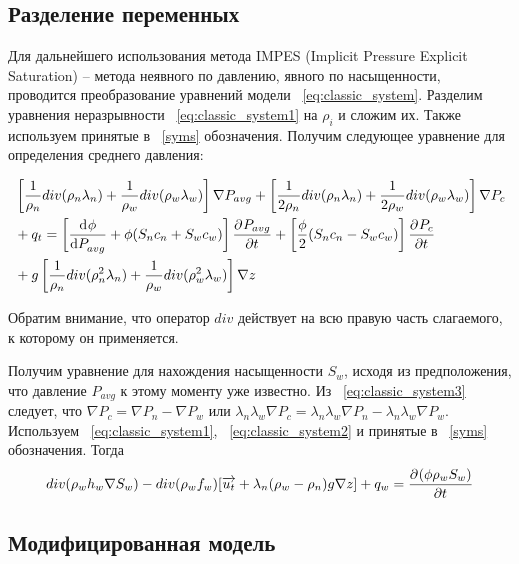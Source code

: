 \subsection{Разделение переменных}
\label{var_division}
Для дальнейшего использования метода IMPES (Implicit Pressure Explicit Saturation) -- метода неявного по давлению,
явного по насыщенности, проводится преобразование уравнений модели ~\eqref{eq:classic_system}.
Разделим уравнения неразрывности ~\eqref{eq:classic_system1} на $\rho_i$ 
и сложим их. Также используем принятые в ~\ref{syms} обозначения.
Получим следующее уравнение для определения среднего давления:

\begin{equation} \label{eq:classic_pressure}
 \begin{aligned}
  &\left[ \frac{1}{\rho_n} div (\rho_n\lambda_n) + \frac{1}{\rho_w} div (\rho_w\lambda_w) \right] \nabla P_{avg} + 
  \left[ \frac{1}{2\rho_n} div (\rho_n\lambda_n) + \frac{1}{2\rho_w} div (\rho_w\lambda_w) \right] \nabla P_c \\
  & + q_t = \left[ \dfrac{\mathrm d^{} \phi}{\mathrm d P_{avg}^{}} + \phi (S_n c_n + S_w c_w) \right] \dfrac{\partial^{} P_{avg}}{\partial t^{}} +
  \left[ \frac{\phi}{2} (S_n c_n - S_w c_w) \right] \dfrac{\partial^{} P_{c}}{\partial t^{}} \\
  & + g \left[ \frac{1}{\rho_n} div (\rho_n^2\lambda_n) + \frac{1}{\rho_w} div (\rho_w^2\lambda_w) \right] \nabla z
 \end{aligned}
\end{equation}

Обратим внимание, что оператор $div$ действует на всю правую часть слагаемого, к которому он применяется.

Получим уравнение для нахождения насыщенности $S_w$, исходя из предположения,
что давление $P_{avg}$ к этому моменту уже известно.
Из ~\eqref{eq:classic_system3} следует, что $\nabla P_c = \nabla P_n - \nabla P_w$ или
$\lambda_n\lambda_w\nabla P_c = \lambda_n\lambda_w\nabla P_n - \lambda_n\lambda_w\nabla P_w$.
Используем ~\eqref{eq:classic_system1}, ~\eqref{eq:classic_system2} и принятые в ~\ref{syms} обозначения.
Тогда
\begin{equation} \label{eq:classic_saturation}
  div(\rho_w h_w \nabla S_w) - div(\rho_w f_w)[\overrightarrow{u_t} + \lambda_n(\rho_w - \rho_n)g \nabla z] + q_w 
  = \dfrac{\partial^{} (\phi \rho_w S_w)}{\partial t^{}}
\end{equation} 
 
\subsection{Модифицированная модель}

